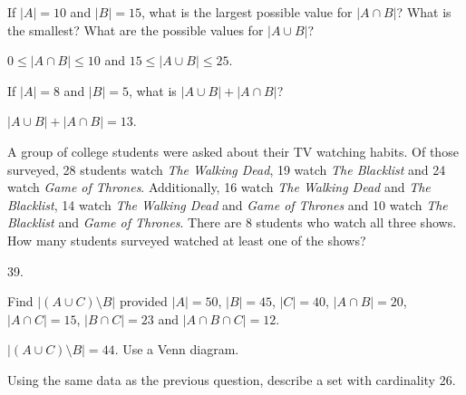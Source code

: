 \begin{questions}
\begin{answer}
  \end{answer}


  
\question If $|A| = 10$ and $|B| = 15$, what is the largest possible value for $|A \cap B|$?  What is the smallest?  What are the possible values for $|A \cup B|$?

  \begin{answer}
    $0 \le |A \cap B| \le 10$ and $15 \le |A \cup B| \le 25$.
  \end{answer}



\question If $|A| = 8$ and $|B| = 5$, what is $|A \cup B| + |A \cap B|$?

  \begin{answer}
      $|A \cup B| + |A \cap B| = 13$.
  \end{answer}

  
  
  
\question A group of college students were asked about their TV watching habits.  Of those surveyed, 28 students watch {\em The Walking Dead}, 19 watch {\em The Blacklist} and 24 watch {\em Game of Thrones}.  Additionally, 16 watch {\em The Walking Dead} and {\em The Blacklist}, 14 watch {\em The Walking Dead} and {\em Game of Thrones} and 10 watch {\em The Blacklist} and {\em Game of Thrones}.  There are 8 students who watch all three shows.  How many students surveyed watched at least one of the shows?

  \begin{answer}
    39.
  \end{answer}



\question Find $|(A \cup C)\setminus B|$ provided $|A| = 50$, $|B| = 45$, $|C| = 40$, $|A\cap B| = 20$, $|A \cap C| = 15$, $|B \cap C| = 23$ and $|A \cap B \cap C| = 12$.

    \begin{answer}
      $|(A \cup C)\setminus B| = 44$.  Use a Venn diagram.
    \end{answer}



\question Using the same data as the previous question, describe a set with cardinality 26.


\end{questions}
